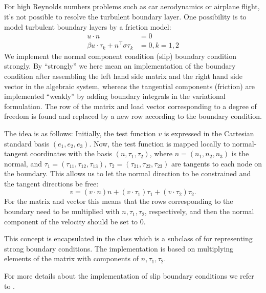 \subsection{}

For high Reynolds numbers problems such as car aerodynamics or airplane
flight, it's not possible to resolve the turbulent boundary layer. One
possibility is to model turbulent boundary layers by a friction model:
\begin{align}
u \cdot n &= 0
\\
\beta u \cdot \tau_k + n^\top \sigma \tau_k &= 0, k = 1, 2
\end{align}
We implement the normal component condition (slip) boundary condition
strongly. By ``strongly'' we here mean an implementation of the boundary
condition after assembling the left hand side matrix and the right hand
side vector in the algebraic system, whereas the tangential components
(friction) are implemented ``weakly'' by adding boundary integrals in
the variational formulation.  The row of the matrix and load vector
corresponding to a degree of freedom is found and replaced by a new row
according to the boundary condition.

The idea is as follows: Initially, the test function $v$ is expressed in
the Cartesian standard basis $(e_1, e_2, e_3)$.  Now, the test function is
mapped locally to normal-tangent coordinates with the basis $(n, \tau_1,
\tau_2)$, where $n = (n_1, n_2, n_3)$ is the normal, and $\tau_1 =
(\tau_{11}, \tau_{12}, \tau_{13})$, $\tau_2 = (\tau_{21}, \tau_{22},
\tau_{23})$ are tangents to each node on the boundary. This allows us
to let the normal direction to be constrained and the tangent directions
be free:
\begin{equation}
     v = (v \cdot n)n + (v \cdot \tau_1) \tau_1 + (v \cdot \tau_2) \tau_2.
\end{equation}
For the matrix and vector this means that the rows corresponding to the
boundary need to be multiplied with $n,\tau_1,\tau_2$, respectively,
and then the normal component of the velocity should be set to 0.

This concept is encapsulated in the class  which is a
subclass of  for representing strong
boundary conditions. The implementation is based on multiplying elements
of the matrix with components of $n, \tau_1, \tau_2$.

For more details about the implementation of slip boundary conditions
we refer to \citet{Nazarov2009}.

